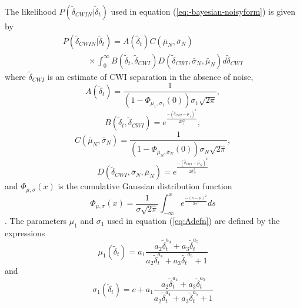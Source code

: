 \documentclass[extra, onecolumn, doublespacing]{gji}
\begin{document}
The likelihood $P(\widetilde{\delta}_{CWIN}|\widetilde{\delta}_t)$
used in equation (\ref{eq:-bayesian-noisyform}) is given by
\begin{equation}
\begin{array}{l}
\label{eq-likelihood-int}
P(\widetilde{\delta}_{CWIN}|\widetilde{\delta}_t)  =
A(\widetilde{\delta}_t) C(\bar{\mu}_N, \bar{\sigma}_N)  \\
\hspace{3em} \times \int_0^\infty
B(\widetilde{\delta}_t,\widetilde{\delta}_{CWI})
D(\widetilde{\delta}_{CWI},\bar{\sigma}_N,\bar{\mu}_N )
d\widetilde{\delta}_{CWI}
\end{array}
\end{equation}
where $\widetilde{\delta}_{CWI}$ is an estimate of CWI separation in the absence
of noise,
\begin{equation}
\label{eq:Adefn}
A(\widetilde{\delta}_t) = \frac{1}{(1-\Phi_{\mu_1,\sigma_1}(0))\sigma_1\sqrt{2\pi} },
\end{equation}
\begin{equation}
B(\widetilde{\delta}_t,\widetilde{\delta}_{CWI})=e^{  \frac{-(\widetilde{\delta}_{CWI}-\mu_1)^2}{2\sigma_1^2} },
\end{equation}
\begin{equation}
\label{eq:Cdefn}
C(\bar{\mu}_N, \bar{\sigma}_N) =  \frac{1}{(1-\Phi_{\bar{\mu}_N,\bar{\sigma}_N}(0))\sigma_N\sqrt{2\pi}},
\end{equation}
\begin{equation}
D(\widetilde{\delta}_{CWI},\bar{\sigma}_N,\bar{\mu}_N )=e^{  \frac{-(\widetilde{\delta}_{CWI}-\bar{\mu}_N)^2}{2 \bar{\sigma}_N ^2} }
\end{equation}
and $\Phi_{\mu,\sigma}(x)$ is the cumulative Gaussian distribution function
\begin{equation}
\label{eq-cummulative-Gaussian}
\Phi_{\mu,\sigma}(x) = \frac{1}{\sigma \sqrt{2 \pi}}
\int_{-\infty}^x e^{  \frac{-(s-\mu)^2}{2\sigma^2}  } ds
\end{equation}
\citep{dr_Robinson11a}. The parameters $\mu_1$ and $\sigma_1$ used
in equation (\ref{eq:Adefn}) are defined by the expressions
\begin{equation}
\label{eq:mu1}
\mu_1(\widetilde{\delta}_t) = a_1\frac{a_2 \widetilde{\delta}_t^{a_4}+a_3
\widetilde{\delta}_t^{a_5}}{a_2 \widetilde{\delta}_t^{a_4}+a_3 \widetilde{\delta_t}^{a_5}+1}
\end{equation}
and
\begin{equation}
\label{eq:sigma1}
\sigma_1(\widetilde{\delta}_t) = c + a_1\frac{a_2 \widetilde{\delta}_t^{a_4}+
a_3 \widetilde{\delta}_t^{a_5}}{a_2 \widetilde{\delta}_t^{a_4}+a_3 \widetilde{\delta}_t^{a_5}+1}
\end{equation}
\end{document}
